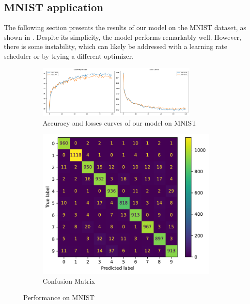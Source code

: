 \subsection{MNIST application}
The following section presents the results of our model on the MNIST dataset, as shown in . Despite its simplicity, the model performs remarkably well. However, there is some instability, which can likely be addressed with a learning rate scheduler or by trying a different optimizer.

\begin{figure}[H]
    \centering
    \begin{subfigure}{\textwidth}
        \centering
        \includegraphics[width=0.88\textwidth]{figs/NN/mnist_acc_loss.pdf}
        \caption{Accuracy and losses curves of our model on MNIST}
        \label{subfig:mnist_acc_loss}
    \end{subfigure}
    \begin{subfigure}{0.45\textwidth}
        \centering
        \includegraphics[width=\textwidth]{figs/NN/mnist_cm.pdf}
        \caption{Confusion Matrix}
        \label{subfig:mnist_cm}
    \end{subfigure}
    \caption{Performance on MNIST}
    \label{fig:mnist}
\end{figure}


